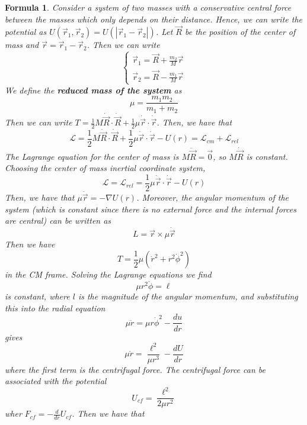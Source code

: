 \documentclass[12pt]{article}
\newtheorem{for}[thm]{Formula}
\theoremstyle{definition}
\theoremstyle{remark}
\numberwithin{equation}{section}
\begin{document}
\begin{for}
        Consider a system of two masses with a conservative central force between the masses which only depends on their distance. Hence, we can write the potential as $U(\vec{r}_1,\vec{r}_2) = U(|\vec{r}_1-\vec{r}_2|)$. Let $\vec{R}$ be the position of the center of mass and $\vec{r} = \vec{r}_1 - \vec{r}_2$. Then we can write \begin{equation}
                \left\{\begin{array}{l} \vec{r}_1 = \vec{R} + \frac{m_2}{M}\vec{r}\\  \vec{r}_2 = \vec{R} - \frac{m_1}{M}\vec{r} \end{array}\right.
        \end{equation}
        We define the \textbf{reduced mass of the system} as \begin{equation}
                \mu = \frac{m_1m_2}{m_1+m_2}
        \end{equation}
        Then we can write $T = \frac{1}{2}M\dot{\vec{R}}\cdot \dot{\vec{R}} + \frac{1}{2}\mu\dot{\vec{r}}\cdot \dot{\vec{r}}$. Then, we have that \begin{equation}
                \mathcal{L} = \frac{1}{2}M\dot{\vec{R}}\cdot \dot{\vec{R}} + \frac{1}{2}\mu\dot{\vec{r}}\cdot \dot{\vec{r}} - U(r) = \mathcal{L}_{cm} + \mathcal{L}_{rel}
        \end{equation}
        The Lagrange equation for the center of mass is $M\ddot{\vec{R}} = \vec{0}$, so $M\dot{\vec{R}}$ is constant. Choosing the center of mass inertial coordinate system, \begin{equation}
                \mathcal{L} = \mathcal{L}_{rel} = \frac{1}{2}\mu\dot{\vec{r}}\cdot \dot{\vec{r}} - U(r)
        \end{equation}
        Then, we have that $\mu\ddot{\vec{r}} = -\nabla U(r)$. Moreover, the angular momentum of the system (which is constant since there is no external force and the internal forces are central) can be written as $$L= \vec{r}\times \mu \dot{\vec{r}}$$ Then we have $$T=\frac{1}{2}\mu(\dot{r}^2+r^2\dot{\phi}^2)$$ in the CM frame. Solving the Lagrange equations we find $$\mu r^2 \dot{\phi} = \ell$$ is constant, where $l$ is the magnitude of the angular momentum, and substituting this into the radial equation $$\mu\ddot{r} = \mu r \dot{\phi}^2-\frac{du}{dr}$$ gives $$\mu\ddot{r} = \frac{\ell^2}{\mu r^3} - \frac{dU}{dr}$$ where the first term is the centrifugal force. The centrifugal force can be associated with the potential $$U_{cf} = \frac{\ell^2}{2\mu r^2}$$ wher $F_{cf} = -\frac{d}{dr}U_{cf}$. Then we have that \begin{equation}

\end{equation}
\end{for}
\end{document}
